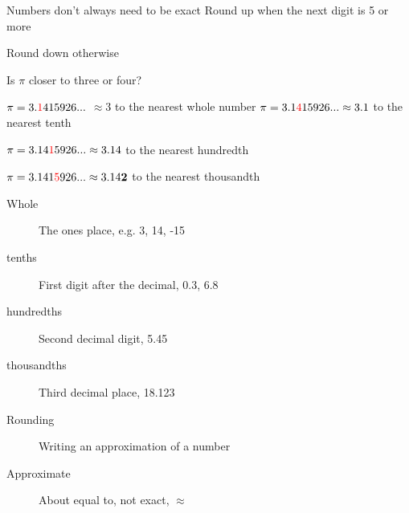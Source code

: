 \documentclass[onlytextwidth]{beamer}
\begin{document}
\begin{frame}{Numbers don't always need to be exact}
    Round up when the next digit is 5 or more \par 
    Round down otherwise \par
     {\hspace{4cm}Is $\pi$ closer to three or four?} \par
        $\pi = 3.{\color{red}1}415926... $
     $\approx 3$ to the nearest whole number
     $\pi = 3.1{\color{red}4}15926... \approx 3.1$ to the nearest tenth \par
        $\pi = 3.14{\color{red}1}5926... \approx 3.14$ to the nearest hundredth \par
        $\pi = 3.141{\color{red}5}926... \approx 3.14{\textbf 2}$ to the nearest thousandth \bigskip
        \begin{description}
        \item[Whole] The ones place, e.g. 3, 14, -15
        \item[tenths] First digit after the decimal, 0.3, 6.8
        \item[hundredths] Second decimal digit, 5.45
        \item[thousandths] Third decimal place, 18.123
        \item[Rounding] Writing an approximation of a number
        \item[Approximate] About equal to, not exact, $\approx$
    \end{description}
    \end{frame}
\end{document}
